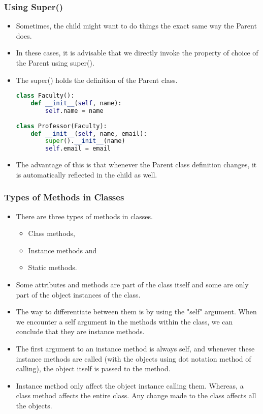 \documentclass{beamer}
\begin{document}
\begin{frame}[fragile]
\frametitle{Using Super()}
\begin{itemize}
\item Sometimes, the child might want to do things the exact same way the Parent does. 
\item In these cases, it is advisable that we directly invoke the property of choice of the Parent using super().

\item The super() holds the definition of the Parent class.
\begin{lstlisting}[language=Python]
class Faculty():
    def __init__(self, name):
        self.name = name
    
class Professor(Faculty):
    def __init__(self, name, email):
        super().__init__(name)
        self.email = email        
\end{lstlisting}

\item The advantage of this is that whenever the Parent class definition changes, it is automatically reflected in the child as well.
\end{itemize}
\end{frame}

\begin{frame}[fragile]
\frametitle{Types of Methods in Classes}
\begin{itemize}
\item There are three types of methods in classes.
\begin{itemize}
\item Class methods,
\item Instance methods and 
\item Static methods.
\end{itemize}
\item Some attributes and methods are part of the class itself and some are only part of the object instances of the class.
\item The way to differentiate between them is by using the "self" argument. When we encounter a self argument in the methods within the class, we can conclude that they are instance methods.
\item The first argument to an instance method is always self, and whenever these instance methods are called (with the objects using dot notation method of calling), the object itself is passed to the method.
\item Instance method only affect the object instance calling them. Whereas, a class method affects the entire class. Any change made to the class affects all the objects.
\end{itemize}
\end{frame}
\end{document}
